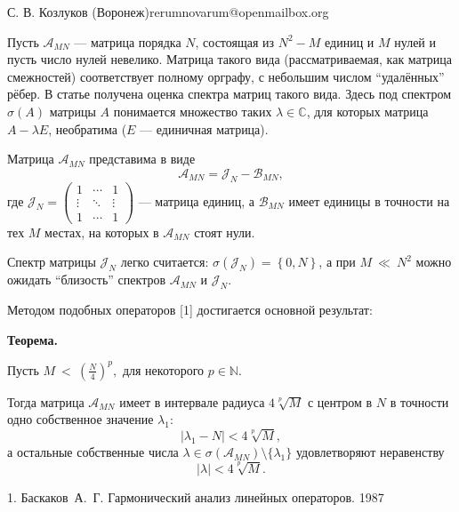\documentclass[a4paper]{article}
\begin{document}
{С. В. Козлуков}
{}{ (Воронеж)}{rerumnovarum@openmailbox.org}

Пусть \( \mathcal{A}_{MN} \) --- матрица порядка \( N \),
состоящая из \( N^2 - M \) единиц и \( M \) нулей
и пусть число нулей невелико.
Матрица такого вида (рассматриваемая, как матрица смежностей) соответствует
полному орграфу, с небольшим числом ``удалённых'' рёбер.
В статье получена оценка спектра
матриц такого вида.
Здесь под спектром \( \sigma\left({A}\right) \) матрицы \( A \)
понимается множество таких \( \lambda\in\mathbb{C} \), для которых
матрица \( A - \lambda E \), необратима (\( E \) --- единичная матрица).

Матрица \( \mathcal{A}_{MN} \) представима в виде
\[
    \mathcal{A}_{MN} = \mathcal{J}_{N} - \mathcal{B}_{MN},
    \]
где \(
\mathcal{J}_{N} =
\begin{pmatrix}1 & \cdots & 1 \\
\vdots & \ddots & \vdots \\
1 & \cdots & 1
\end{pmatrix} \) --- матрица единиц,
а \( \mathcal{B}_{MN} \) имеет единицы в точности на тех \( M \)
местах, на которых в \( \mathcal{A}_{MN} \) стоят нули.

Спектр матрицы \( \mathcal{J}_{N} \) легко считается:
\( \sigma\left({\mathcal{J}_{N}}\right) = \left\{0, N \right\} \),
а при \( M~\ll~N^2 \) можно ожидать ``близость'' спектров
\( \mathcal{A}_{MN} \) и \( \mathcal{J}_{N} \).

Методом подобных операторов [1]
достигается основной результат:

\textbf{Теорема.}
\begin{center}\relax
    Пусть
    \(M~<~\displaystyle{\left(\frac{N}{4}\right)^p}, \)
    для некоторого \( p\in\mathbb{N} \).

Тогда матрица \( \mathcal{A}_{MN} \) имеет в интервале
    радиуса \( 4\sqrt[p]{M} \) с центром в \( N \)
    в точности одно собственное значение \( \lambda_1 \):
    \[ \lvert \lambda_1 - N \rvert < 4\sqrt[p]{M}, \]
    а остальные собственные числа
    \( \lambda\in\sigma\left({\mathcal{A}_{MN}}\right)\setminus\{\lambda_1\} \)
    удовлетворяют неравенству
    \[ \lvert \lambda \rvert < 4\sqrt[p]{M}. \]
\end{center}

\liter

1. Баскаков~А.~Г. Гармонический анализ линейных операторов. 1987
\end{document}
